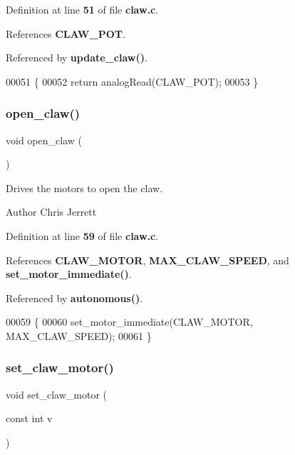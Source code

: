 Definition at line \textbf{ 51} of file \textbf{ claw.\+c}.



References \textbf{ C\+L\+A\+W\+\_\+\+P\+OT}.



Referenced by \textbf{ update\+\_\+claw()}.


\begin{DoxyCode}
00051                            \{
00052   \textcolor{keywordflow}{return} analogRead(CLAW_POT);
00053 \}
\end{DoxyCode}
\mbox{\label{claw_8c_a03023ca28f671b9fa7bac07782ccd8c1}} 
\subsubsection{open\+\_\+claw()}
{\footnotesize\ttfamily void open\+\_\+claw (\begin{DoxyParamCaption}{ }\end{DoxyParamCaption})}



Drives the motors to open the claw. 

\begin{DoxyAuthor}{Author}
Chris Jerrett 
\end{DoxyAuthor}


Definition at line \textbf{ 59} of file \textbf{ claw.\+c}.



References \textbf{ C\+L\+A\+W\+\_\+\+M\+O\+T\+OR}, \textbf{ M\+A\+X\+\_\+\+C\+L\+A\+W\+\_\+\+S\+P\+E\+ED}, and \textbf{ set\+\_\+motor\+\_\+immediate()}.



Referenced by \textbf{ autonomous()}.


\begin{DoxyCode}
00059                  \{
00060   set_motor_immediate(CLAW_MOTOR, MAX_CLAW_SPEED);
00061 \}
\end{DoxyCode}
\mbox{\label{claw_8c_a3a57f998b1884d39b0cc786689f7086f}} 
\subsubsection{set\+\_\+claw\+\_\+motor()}
{\footnotesize\ttfamily void set\+\_\+claw\+\_\+motor (\begin{DoxyParamCaption}\item[{const int}]{v }\end{DoxyParamCaption})}



